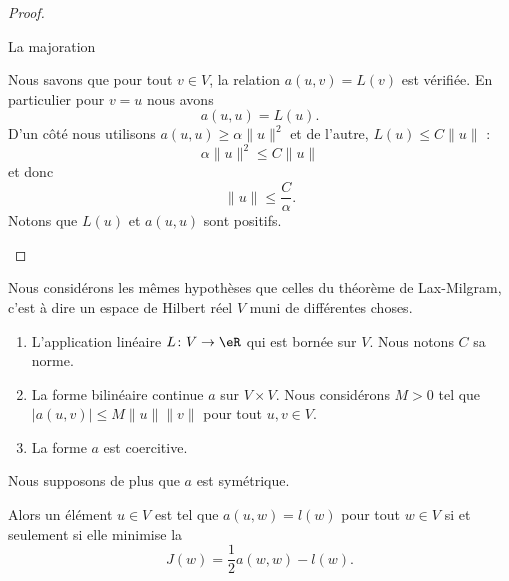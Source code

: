 \begin{proof}
\begin{subproof}
            \item[La majoration]

                Nous savons que pour tout \( v\in V\), la relation \( a(u,v)=L(v)\) est vérifiée. En particulier pour \( v=u\) nous avons
                \begin{equation}
                    a(u,u)=L(u).
                \end{equation}
                D'un côté nous utilisons \( a(u,u)\geq \alpha\| u \|^2\) et de l'autre, \( L(u)\leq C\| u \|\) :
                \begin{equation}
                    \alpha\| u \|^2\leq C\| u \|
                \end{equation}
                et donc
                \begin{equation}
                    \| u \|\leq \frac{ C }{ \alpha }.
                \end{equation}
                Notons que \( L(u)\) et \( a(u,u)\) sont positifs.
    \end{subproof}
\end{proof}

\begin{theorem}
    Nous considérons les mêmes hypothèses que celles du théorème de Lax-Milgram, c'est à dire un espace de Hilbert réel \( V\) muni de différentes choses.
    \begin{enumerate}
        \item
            L'application linéaire \( L\colon V\to \eR\) qui est bornée sur \( V\). Nous notons \( C\) sa norme.
        \item
            La forme bilinéaire continue \( a\) sur \( V\times V\). Nous considérons \( M>0\) tel que \( | a(u,v) |\leq M\| u \|\| v \|\) pour tout \( u,v\in V\).
        \item
            La forme \( a\) est coercitive.
    \end{enumerate}
    Nous supposons de plus que \( a\) est symétrique. 

    Alors un élément \( u\in V\) est tel que \( a(u,w)=l(w)\) pour tout \( w\in V\) si et seulement si elle minimise la 
    \begin{equation}
        J(w)=\frac{ 1 }{2}a(w,w)-l(w).
    \end{equation}
\end{theorem}

